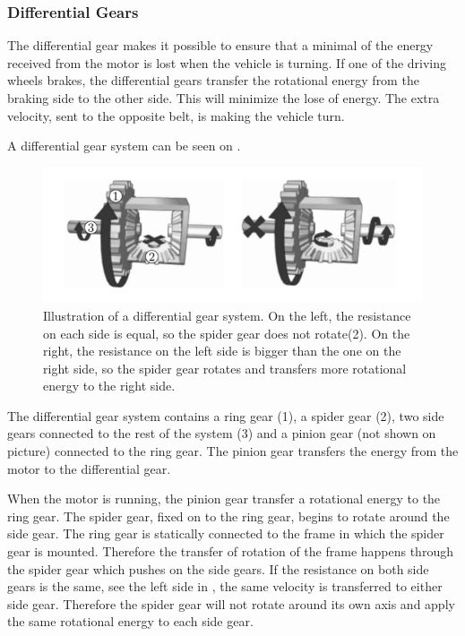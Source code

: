 \subsubsection{Differential Gears} \label{sec:Differentialgears}
The differential gear makes it possible to ensure that a minimal of the energy received from the motor is lost when the vehicle is turning. If one of the driving wheels brakes, the differential gears transfer the rotational energy from the braking side to the other side. This will minimize the lose of energy. The extra velocity, sent to the opposite belt, is making the vehicle turn.

A differential gear system can be seen on .

\begin{figure}[H]
	\centering
	\includegraphics[scale=0.7]{figures/diffGearLightGray.pdf}
	\caption{Illustration of a differential gear system. On the left, the resistance on each side is equal, so the spider gear does not rotate(2). On the right, the resistance on the left side is bigger than the one on the right side, so the spider gear rotates and transfers more rotational energy to the right side. \cite{MechanicalEngineering}}
	\label{diffGearLight}
\end{figure}

The differential gear system contains a ring gear (1), a spider gear (2), two side gears connected to the rest of the system (3) and a pinion gear (not shown on picture) connected to the ring gear. The pinion gear transfers the energy from the motor to the differential gear.

When the motor is running, the pinion gear transfer a rotational energy to the ring gear. The spider gear, fixed on to the ring gear, begins to rotate around the side gear. The ring gear is statically connected to the frame in which the spider gear is mounted. Therefore the transfer of rotation of the frame happens through the spider gear which pushes on the side gears. If the resistance on both side gears is the same, see the left side in , the same velocity is transferred to either side gear. Therefore the spider gear will not rotate around its own axis and apply the same rotational energy to each side gear.

